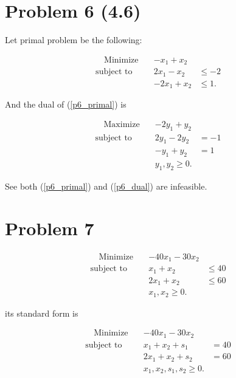 \documentclass[12pt]{article}
\begin{document}
\section*{Problem 6 (4.6)}

Let primal problem be the following:

\begin{equation}\label{p6_primal}
\begin{aligned}
 \quad \text{Minimize} \quad & -x_1 + x_2 & \\
\text{subject\  to} \quad & 2x_1 - x_2 & \leqslant  -2 \\
& -2x_1 + x_2 & \leqslant 1 .
\end{aligned}
\end{equation}

And the dual of (\ref{p6_primal}) is

\begin{equation}\label{p6_dual}
\begin{aligned}
 \quad \text{Maximize} \quad & -2y_1 + y_2 & \\
\text{subject\  to} \quad & 2y_1 - 2y_2 & = -1 \\
& -y_1 + y_2 & = 1 \\
& y_1, y_2 \geqslant 0.
\end{aligned}
\end{equation}

See both (\ref{p6_primal}) and (\ref{p6_dual}) are infeasible.


\section*{Problem 7}

\begin{equation}\label{p7_primal}
\begin{aligned}
 \quad \text{Minimize} \quad & -40x_1 -30x_2 & \\
\text{subject\  to} \quad & x_1 + x_2 & \leqslant  40 \\
& 2x_1 + x_2 & \leqslant  60 \\
& x_1, x_2 \geqslant 0 .
\end{aligned}
\end{equation}

its standard form is

\begin{equation}\label{p7_primal_std}
\begin{aligned}
 \quad \text{Minimize} \quad & -40x_1 -30x_2 & \\
\text{subject\  to} \quad & x_1 + x_2 + s_1 & =  40 \\
& 2x_1 + x_2 + s_2& =  60 \\
& x_1, x_2, s_1, s_2 \geqslant 0 .
\end{aligned}
\end{equation}
\end{document}
